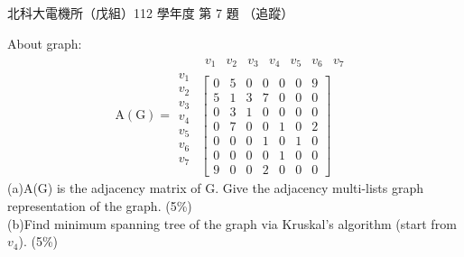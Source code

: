 \begin{pastexam}[label={px:ntut-112-ee-ds-07}]{北科大電機所（戊組）112 學年度 第 7 題}
（追蹤）

About graph:
\[
\mathrm{A(G)}=
\begin{array}{c}
\\ v_1\\ v_2\\ v_3\\ v_4\\ v_5\\ v_6\\ v_7
\end{array}
\!\!
\begin{array}{c}
\begin{array}{ccccccc} v_1 & v_2 & v_3 & v_4 & v_5 & v_6 & v_7\end{array}\\
\begin{bmatrix}
0 & 5 & 0 & 0 & 0 & 0 & 9\\
5 & 1 & 3 & 7 & 0 & 0 & 0\\
0 & 3 & 1 & 0 & 0 & 0 & 0\\
0 & 7 & 0 & 0 & 1 & 0 & 2\\
0 & 0 & 0 & 1 & 0 & 1 & 0\\
0 & 0 & 0 & 0 & 1 & 0 & 0\\
9 & 0 & 0 & 2 & 0 & 0 & 0
\end{bmatrix}
\end{array}
\]
(a)A(G) is the adjacency matrix of G. Give the adjacency multi-lists graph representation of the
graph. (5\%)\\
(b)Find minimum spanning tree of the graph via Kruskal's algorithm (start from $v_4$). (5\%)
\end{pastexam}

